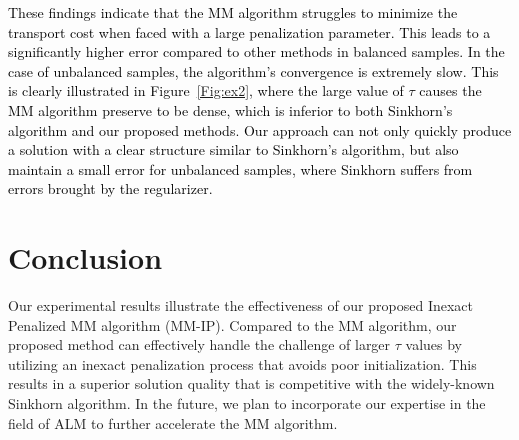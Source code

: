 \documentclass[a4paper,twocolumn]{article}
\newcommand{\changeSX}[1]{\textcolor{black}{#1}}
\begin{document}
\changeSX{These findings indicate that the MM algorithm struggles to minimize the transport cost when faced with a large penalization parameter. This leads to a significantly higher error compared to other methods in balanced samples. In the case of unbalanced samples, the algorithm's convergence is extremely slow. This is clearly illustrated in Figure~\ref{Fig:ex2}, where the large value of $\tau$ causes the MM algorithm preserve to be dense, which is inferior to both Sinkhorn's algorithm and our proposed methods. Our approach can not only quickly produce a solution with a clear structure similar to Sinkhorn's algorithm, but also maintain a small error for unbalanced samples, where Sinkhorn suffers from errors brought by the regularizer.}



\section{Conclusion}
Our experimental results illustrate the effectiveness of our proposed Inexact Penalized MM algorithm (MM-IP). Compared to the MM algorithm, our proposed method can effectively handle the challenge of larger $\tau$ values by utilizing an inexact penalization process that avoids poor initialization. This results in a superior solution quality that is competitive with the widely-known Sinkhorn algorithm. In the future, we plan to incorporate our expertise in the field of ALM to further accelerate the MM algorithm.




\end{document}
